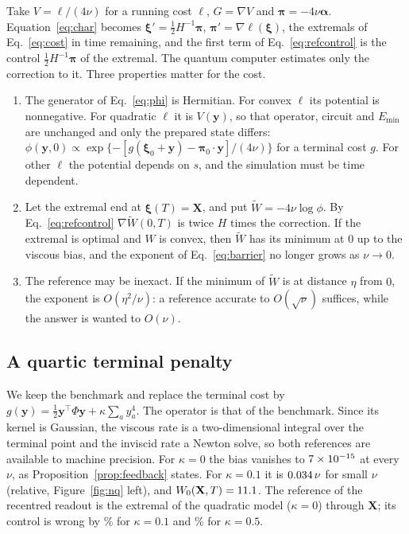 \documentclass[11pt,a4paper]{article}
\theoremstyle{remark}
\newcommand{\X}{\mathbf X}
\begin{document}
Take $V=\ell/(4\nu)$ for a running cost $\ell$, $G=\nabla V$ and
$\boldsymbol\pi=-4\nu\boldsymbol\alpha$. Equation~\eqref{eq:char} becomes
$\boldsymbol\xi'=\tfrac12H^{-1}\boldsymbol\pi$, $\boldsymbol\pi'=\nabla\ell(\boldsymbol\xi)$, the extremals of
Eq.~\eqref{eq:cost} in time remaining, and the first term of Eq.~\eqref{eq:refcontrol} is the control
$\tfrac12H^{-1}\boldsymbol\pi$ of the extremal. The quantum computer estimates only the
correction to it. Three properties matter for the cost.
\begin{enumerate}
\item The generator of Eq.~\eqref{eq:phi} is Hermitian. For convex $\ell$ its potential is nonnegative. For quadratic $\ell$
it is $V(\mathbf y)$, so that operator, circuit and $E_{\min}$ are unchanged and only the prepared state differs:
$\phi(\mathbf y,0)\propto\exp\{-[g(\boldsymbol\xi_0+\mathbf y)-\boldsymbol\pi_0\!\cdot\!\mathbf y]/(4\nu)\}$ for a terminal cost $g$.
For other $\ell$ the potential depends on $s$, and the simulation must be time dependent.
\item Let the extremal end at $\boldsymbol\xi(T)=\X$, and put $\widetilde W=-4\nu\log\phi$. By Eq.~\eqref{eq:refcontrol}
$\nabla\widetilde W(0,T)$ is twice $H$ times the correction. If the extremal is optimal
and $W$ is convex, then $\widetilde W$ has its minimum at $0$ up to the viscous bias, and the exponent of
Eq.~\eqref{eq:barrier} no longer grows as $\nu\to0$.
\item The reference may be inexact. If the minimum of $\widetilde W$ is at distance $\eta$ from $0$, the exponent is
$O(\eta^2/\nu)$: a reference accurate to $O(\sqrt\nu)$ suffices, while the answer is wanted to $O(\nu)$.
\end{enumerate}

\subsection{A quartic terminal penalty}

We keep the benchmark and replace the terminal cost by
$g(\mathbf y)=\tfrac12\mathbf y^\top\Phi\mathbf y+\kappa\sum_ay_a^4$. The operator is that of the
benchmark. Since its kernel is Gaussian, the viscous rate is a two-dimensional integral over the terminal
point and the inviscid rate a Newton solve, so both references are available to machine precision.
For $\kappa=0$ the bias vanishes to $7\times10^{-15}$ at every $\nu$, as
Proposition~\ref{prop:feedback} states. For $\kappa=0.1$ it is $0.034\,\nu$ for small $\nu$ (relative,
Figure~\ref{fig:nq} left), and $W_0(\X,T)=\NqW$. The reference of the recentred readout is the extremal of the
quadratic model ($\kappa=0$) through $\X$; its control is wrong by \NqRef\% for
$\kappa=0.1$ and \NqRefHard\% for $\kappa=0.5$.
\end{document}
